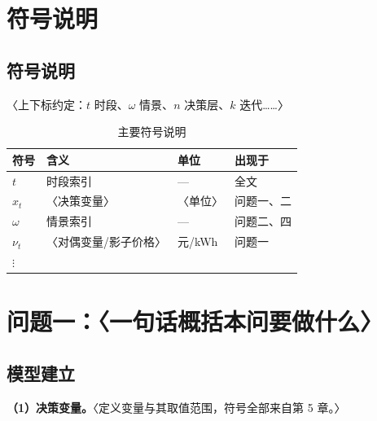 \documentclass[12pt,a4paper]{ctexart}
\newif\ifwritemode
\newcommand{\guide}[1]{%
  \ifwritemode\par\noindent{\small\color{guideblue}\textbf{【写作提示】}#1}\par\fi}
\newcommand{\tabhead}[1]{\textbf{#1}}
\begin{document}
\section{符号说明}\label{sec:symbol}
\guide{符号表覆盖全部 N 问，宁可多列；正文每个公式里的符号都必须能在此查到。上下标约定单独一句写清。}

\subsection{符号说明}
〈上下标约定：$t$ 时段、$\omega$ 情景、$n$ 决策层、$k$ 迭代……〉

\begin{table}[htbp]\centering\small
  \caption{主要符号说明}\label{tab:symbol}
  \begin{tabular}{llll}
    \toprule
    \tabhead{符号} & \tabhead{含义} & \tabhead{单位} & \tabhead{出现于} \\
    \midrule
    $t$ & 时段索引 & — & 全文 \\
    $x_t$ & 〈决策变量〉 & 〈单位〉 & 问题一、二 \\
    $\omega$ & 情景索引 & — & 问题二、四 \\
    $\nu_t$ & 〈对偶变量/影子价格〉 & 元/kWh & 问题一 \\
    $\vdots$ & & & \\
    \bottomrule
  \end{tabular}
\end{table}


\section{问题一：〈一句话概括本问要做什么〉}\label{sec:q1}

\subsection{模型建立}
\guide{五步固定顺序：变量定义 → 目标函数 → 约束逐条列式并编号 → 模型类型判断 →（复杂问才）子模块拆解。只引用第 5 章的符号，不新造。}

\noindent\textbf{（1）决策变量。}〈定义变量与其取值范围，符号全部来自第 5 章。〉
\end{document}
